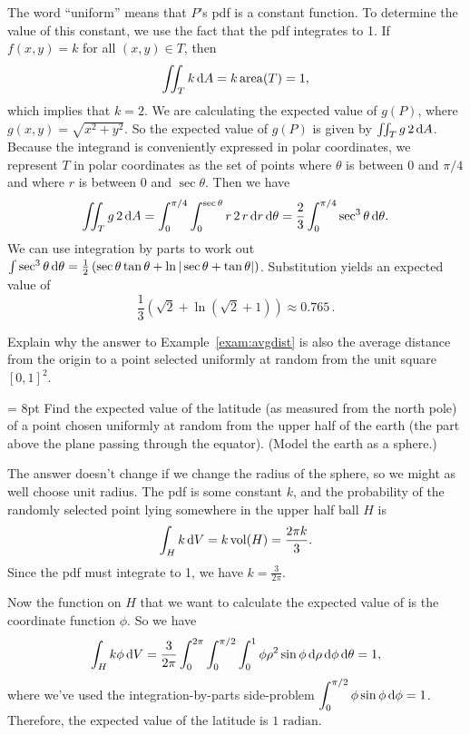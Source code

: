 \documentclass{watsonbook}
\begin{document}
\begin{solution}
  The word ``uniform'' means that $P$'s pdf is a constant function. To
  determine the value of this constant, we use the fact that the pdf
  integrates to 1. If $f(x,y) = k$ for all $(x,y) \in T$, then
  \[
    \iint_T k \, \mathrm{d} A = k\, \mathrm{area}(T) = 1, 
  \]
  which implies that $k=2$. We are calculating the expected
  value of $g(P)$, where $g(x,y) = \sqrt{x^2 + y^2}$. So the expected
  value of $g(P)$ is given by $\iint_T g \, 2\,\mathrm{d} A$. Because the
  integrand is conveniently expressed in polar coordinates, we
  represent $T$ in polar coordinates as the set of points where
  $\theta$ is between $0$ and $\pi/4$ and where $r$ is between 0
  and $\sec \theta$. Then we have
  \[
    \iint_T g \, 2\, \mathrm{d} A = \int_{0}^{\pi/4} \int_0^{\sec \theta} r
    \, 2\, r \, \mathrm{d} r\, \mathrm{d}\theta = \frac{2}{3} \int_{0}^{\pi/4} \sec^3
    \theta \, \mathrm{d}\theta. 
  \]
  We can use integration by parts to work out
  $\int \sec^3 \theta \, \mathrm{d} \theta = \frac{1}{2}\left(\sec \theta \tan
    \theta + \ln|\sec\theta + \tan \theta|\right)$.
  Substitution yields an expected value of
  \[
    \boxed{\frac{1}{3}\left(\sqrt{2} +
        \ln\left({\sqrt{2}+1}\right)\right) \approx
      0.765}\,.
  \]
\end{solution}

\begin{exercise}{}{}
  Explain why the answer to Example~\ref{exam:avgdist} is also the
  average distance from the origin to a point selected uniformly at
  random from the unit square $[0,1]^2$. 
\end{exercise}

\begin{example}{}{} \parskip = 8pt Find the expected value of the
  latitude (as measured from the north pole) of a point chosen
  uniformly at random from the upper half of the earth (the part above
  the plane passing through the equator). (Model the earth as a
  sphere.)
\end{example}

\begin{solution}
  The answer doesn't change if we change the radius of the sphere, so
  we might as well choose unit radius. The pdf is some constant $k$,
  and the probability of the randomly selected point lying somewhere
  in the upper half ball $H$ is
  \[
    \int_H k \, \mathrm{d} V = k\, \mathrm{vol}(H) = \frac{2\pi k}{3}. 
  \]
  Since the pdf must integrate to 1, we have $k =
  \tfrac{3}{2\pi}$.

  Now the function on $H$ that we want to calculate the expected value
  of is the coordinate function $\phi$. So we have
  \[
    \int_H k\phi \, \mathrm{d} V = \frac{3}{2\pi} \int_0^{2\pi} \int
    _0^{\pi/2}\int_{0}^{1} \phi \rho^2 \sin \phi \, \mathrm{d} \rho \, \mathrm{d} \phi
    \, \mathrm{d} \theta = 1, 
  \]
  where we've used the integration-by-parts side-problem
  $\displaystyle{\int_0^{\pi/2} \phi \sin \phi \, \mathrm{d}\phi =
    1}$. Therefore, the expected value of the latitude is
  $\boxed{1 \text{ radian}}$.
\end{solution}
\end{document}
